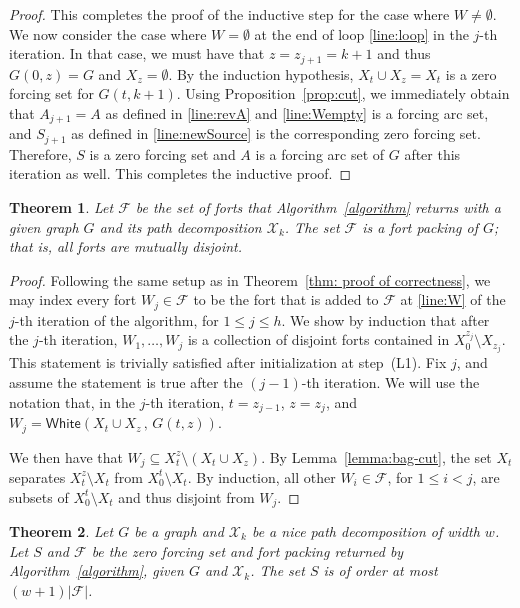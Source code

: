 \documentclass[12pt]{amsart}
\theoremstyle{plain}
\newtheorem{theorem}{Theorem}[section]
\theoremstyle{definition}
\def\F{\mathcal F}
\def\X{\mathcal X}
\def\calF{\mathcal{F}}
\renewcommand{\subset}{\subseteq}
\newcommand{\white}{\mathsf{White}}
\newcommand{\sm}{\setminus}
\begin{document}
\begin{proof}
This completes the proof of the inductive step for the case where $W\neq \emptyset$.
We now consider the case where 
$W = \emptyset$ at the end of loop \ref{line:loop} in the $j$-th iteration. In that case, we must have that $z=z_{j+1}=k+1$ and thus $G(0,z)=G$ and $X_z=\emptyset$. By the induction hypothesis, $X_t\cup X_z=X_t$ is a zero forcing set for $G(t,k+1)$. Using Proposition~\ref{prop:cut}, we immediately obtain that $A_{j+1}=A$ as defined in \ref{line:revA} and \ref{line:Wempty} is a forcing arc set, and $S_{j+1}$ as defined in \ref{line:newSource} is the corresponding zero forcing set.  Therefore, $S$ is a zero forcing set and $A$ is a forcing arc set of $G$ after this iteration as well. 
This completes the inductive proof. 
\end{proof}
\begin{theorem}
    Let $\mathcal{F}$ be the set of forts that Algorithm~\ref{algorithm} returns with a given graph $G$ and its path decomposition $\X_k$. 
    The set $\mathcal{F}$ is a fort packing of $G$; that is, all forts are mutually disjoint. 
\end{theorem}
\begin{proof}
    Following the same setup as in Theorem~\ref{thm: proof of correctness}, we may index every fort $W_j\in\calF$ to be the fort that is added to $\calF$ at \ref{line:W} of the $j$-th iteration of the algorithm, for $1\leq j\leq h$. 
    {We show by induction that after the $j$-th iteration, $W_1,\dots ,W_{j}$ is a collection of disjoint forts contained in $X_0^{z_j}\setminus X_{z_j}$.} This statement is trivially satisfied after initialization at step~(L1). Fix $j$, and assume the statement is true after the $(j-1)$-th iteration.
    We will use the notation that, in the $j$-th iteration, $t=z_{j-1}$, $z=z_j$, and $W_j= \white(X_{t}\cup X_{z}\,,\, G(t,z))$. 

    We then have that $W_j\subset X_{t}^{z}\sm (X_t \cup X_z)$. 
    By Lemma~\ref{lemma:bag-cut}, the set $X_{t}$ separates $X_{t}^{z}\sm X_{t}$ from $X_0^{t}\sm X_{t}$. 
    By induction, all other $W_i\in\F$, for $1\leq i< j$, are subsets of $X_0^t\sm X_t$ and thus disjoint from $W_j$.
\end{proof}
\begin{theorem}\label{thm:ratio}
Let $G$ be a graph and $\X_k$ be a nice path decomposition of width $w$.
Let $S$ and $\F$ be the zero forcing set and fort packing returned by Algorithm~\ref{algorithm}, given $G$ and $\X_k$. 
The set $S$ is of order at most $(w+1)|\F|$.
\end{theorem}
\end{document}
